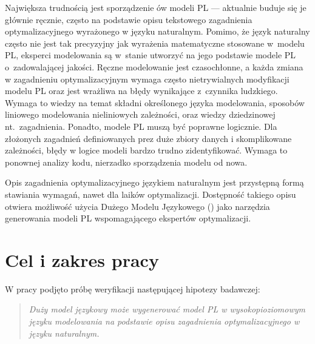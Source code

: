 Największa trudnością jest sporządzenie ów modeli PL --- aktualnie buduje się je głównie ręcznie, często na podstawie opisu tekstowego zagadnienia optymalizacyjnego wyrażonego w języku naturalnym.  Pomimo, że język naturalny często nie jest tak precyzyjny jak wyrażenia matematyczne stosowane w~modelu PL, eksperci modelowania są w~stanie utworzyć na jego podstawie modele PL o~zadowalającej jakości.
Ręczne modelowanie jest czasochłonne, a każda zmiana w zagadnieniu optymalizacyjnym wymaga często nietrywialnych modyfikacji modelu PL oraz jest wrażliwa na błędy wynikające z~czynnika ludzkiego. Wymaga to wiedzy na temat składni określonego języka modelowania, sposobów liniowego modelowania nieliniowych zależności, oraz wiedzy dziedzinowej nt.~zagadnienia.
Ponadto, modele PL muszą być poprawne logicznie. %
Dla złożonych zagadnień definiowanych prez duże zbiory danych i skomplikowane zależności, błędy w logice modeli bardzo trudno zidentyfikować. Wymaga to ponownej analizy kodu, nierzadko sporządzenia modelu od nowa.

Opis zagadnienia optymalizacyjnego językiem naturalnym jest przystępną formą stawiania wymagań, nawet dla laików optymalizacji. Dostępność takiego opisu otwiera możliwość użycia Dużego Modelu Językowego ()  jako narzędzia generowania modeli PL wspomagającego ekspertów optymalizacji.



\section{Cel i zakres pracy}\label{sec:intro:aim}

W pracy podjęto próbę weryfikacji następującej hipotezy badawczej:
\begin{quote}
\textit{Duży model językowy może wygenerować model PL w wysokopioziomowym języku modelowania na podstawie opisu zagadnienia optymalizacyjnego w języku naturalnym.}
\end{quote}


